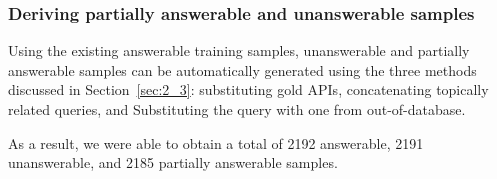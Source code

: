 \subsubsection{Deriving partially answerable and unanswerable samples}
Using the existing answerable training samples, unanswerable and partially answerable samples can be automatically generated using the three methods discussed in Section~\ref{sec:2_3}: substituting gold APIs, concatenating topically related queries, and Substituting the query with one from out-of-database.

As a result, we were able to obtain a total of 2192 answerable, 2191 unanswerable, and 2185 partially answerable samples.

